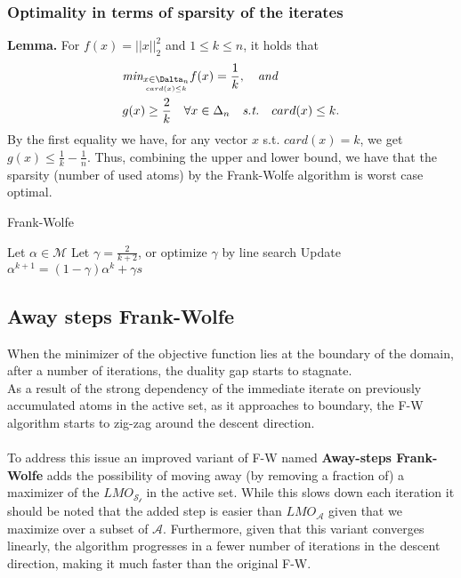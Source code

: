 \documentclass{article}
\begin{document}
\subsubsection{Optimality in terms of sparsity of the iterates}
\textbf{Lemma.} For $f(x)= ||x||_{2}^{2}$ and $1\leq k\leq n$, it holds that
\begin{equation*}
\begin{aligned}
      &\textit{min}_{\underset{card(x)\leq
      k}{x\in\Dalta_{n}}}f(x)= \frac{1}{k},\quad\textit{and}\\
      &g(x)\geq \frac{2}{k}\quad\forall x\in\Delta_{n}\quad\textit{s.t.}\quad card(x)\leq k. 
\end{aligned}    
\end{equation*}
By the first equality we have, for any vector $x$ s.t. $card(x)= k$, we get $g(x)\leq \frac{1}{k}- \frac{1}{n}$.
Thus, combining the upper and lower bound, we have that the sparsity (number of used atoms) by the Frank-Wolfe algorithm is worst case optimal.
\begin{algorithm}[tb]
   \caption{Frank-Wolfe}
   \label{alg:example}
\begin{algorithmic}
   \STATE Let $\alpha\in\mathcal{M}$
   \STATE Let $\gamma = \frac{2}{k+2}$, or optimize $\gamma$ by line search
   \STATE Update $\alpha^{k+1}= (1-\gamma)\alpha^{k}+ \gamma s$
   \ENDFOR
\end{algorithmic}
\end{algorithm}
\subsection{Away steps Frank-Wolfe}
When the minimizer of the objective function lies at the boundary of the domain, after a number of iterations, the duality gap starts to stagnate.\\
As a result of the strong dependency of the immediate iterate on previously accumulated atoms in the active set, as it approaches to boundary, the F-W algorithm starts to zig-zag around the descent direction.\\
\\
To address this issue an improved variant of F-W named \textbf{Away-steps Frank-Wolfe} adds the possibility of moving away (by removing a fraction of) a maximizer of the $LMO_{\mathcal{S_{t}}}$ in the active set. While this slows down each iteration it should be noted that the added step is easier than $LMO_{\mathcal{A}}$ given that we maximize over a subset of $\mathcal{A}$. Furthermore, given that this variant converges linearly, the algorithm progresses in a fewer number of iterations in the descent direction, making it much faster than the original F-W.
\end{document}
